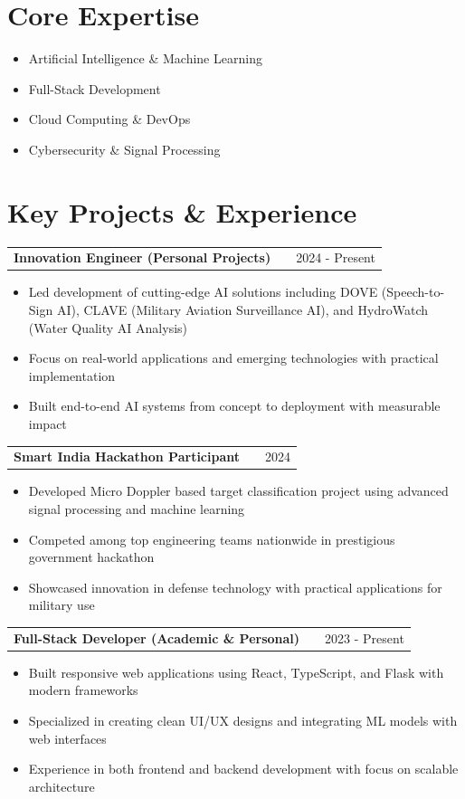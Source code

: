 \documentclass[a4paper,12pt]{article}
\makeatletter
\newenvironment{joblong}[2]
    {
    \begin{tabularx}{\linewidth}{@{}l X r@{}}
    \textbf{#1} & \hfill &  #2 \\[2pt]
    \end{tabularx}
    \begin{minipage}[t]{\linewidth}
    \begin{itemize}[nosep,after=\strut, leftmargin=1em, itemsep=2pt,label=--]
    }
    {
    \end{itemize}
    \end{minipage}    
    }
\makeatother
\begin{document}
\section{Core Expertise}
\begin{itemize}[nosep,after=\strut, leftmargin=1em, itemsep=3pt,label=$\bullet$]
\item Artificial Intelligence \& Machine Learning
\item Full-Stack Development 
\item Cloud Computing \& DevOps
\item Cybersecurity \& Signal Processing
\end{itemize}

\section{Key Projects \& Experience}

\begin{joblong}{Innovation Engineer (Personal Projects)}{2024 - Present}
\item Led development of cutting-edge AI solutions including DOVE (Speech-to-Sign AI), CLAVE (Military Aviation Surveillance AI), and HydroWatch (Water Quality AI Analysis)
\item Focus on real-world applications and emerging technologies with practical implementation
\item Built end-to-end AI systems from concept to deployment with measurable impact
\end{joblong}

\begin{joblong}{Smart India Hackathon Participant}{2024}
\item Developed Micro Doppler based target classification project using advanced signal processing and machine learning
\item Competed among top engineering teams nationwide in prestigious government hackathon
\item Showcased innovation in defense technology with practical applications for military use
\end{joblong}

\begin{joblong}{Full-Stack Developer (Academic \& Personal)}{2023 - Present}
\item Built responsive web applications using React, TypeScript, and Flask with modern frameworks
\item Specialized in creating clean UI/UX designs and integrating ML models with web interfaces
\item Experience in both frontend and backend development with focus on scalable architecture
\end{joblong}
\end{document}
